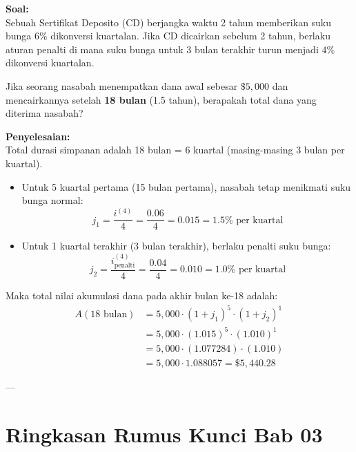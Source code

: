 \documentclass[11pt,a4paper]{article}
\begin{document}
\begin{examplebox}
\textbf{Soal:}\\
Sebuah Sertifikat Deposito (CD) berjangka waktu 2 tahun memberikan suku bunga $6\%$ dikonversi kuartalan. Jika CD dicairkan sebelum 2 tahun, berlaku aturan penalti di mana suku bunga untuk 3 bulan terakhir turun menjadi $4\%$ dikonversi kuartalan.

Jika seorang nasabah menempatkan dana awal sebesar $\$5{,}000$ dan mencairkannya setelah \textbf{18 bulan} (1.5 tahun), berapakah total dana yang diterima nasabah?

\vspace{0.5em}
\textbf{Penyelesaian:}\\
Total durasi simpanan adalah 18 bulan = 6 kuartal (masing-masing 3 bulan per kuartal).
\begin{itemize}
    \item Untuk 5 kuartal pertama (15 bulan pertama), nasabah tetap menikmati suku bunga normal:
    \begin{equation*}
        j_1 = \frac{i^{(4)}}{4} = \frac{0.06}{4} = 0.015 = 1.5\% \text{ per kuartal}
    \end{equation*}
    \item Untuk 1 kuartal terakhir (3 bulan terakhir), berlaku penalti suku bunga:
    \begin{equation*}
        j_2 = \frac{i_{\text{penalti}}^{(4)}}{4} = \frac{0.04}{4} = 0.010 = 1.0\% \text{ per kuartal}
    \end{equation*}
\end{itemize}
Maka total nilai akumulasi dana pada akhir bulan ke-18 adalah:
\begin{align*}
    A(18 \text{ bulan}) &= 5{,}000 \cdot (1 + j_1)^5 \cdot (1 + j_2)^1 \\
                        &= 5{,}000 \cdot (1.015)^5 \cdot (1.010)^1 \\
                        &= 5{,}000 \cdot (1.077284) \cdot (1.010) \\
                        &= 5{,}000 \cdot 1.088057 = \$5{,}440.28
    \end{align*}
\end{examplebox}

---

\section{Ringkasan Rumus Kunci Bab 03}
\end{document}
